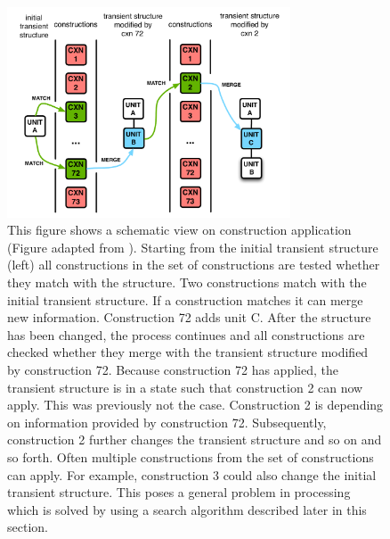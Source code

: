 \begin{figure}
\begin{center}
\includegraphics[width=0.75\textwidth]{figs/high-level-cxn-application}
\end{center}
\caption[Construction application]{This figure shows a schematic view on 
construction application (Figure adapted from \citealp{steels2011design}).
Starting from the initial transient structure (left)
all constructions in the set of constructions are tested whether they 
match with the structure. Two constructions match with the
initial transient structure. If a construction matches it 
can merge new information. Construction 72 adds 
unit C. After the structure has been changed, the process continues
and all constructions are checked whether they merge with
the transient structure modified by construction 72.
Because construction 72 has applied, the transient
structure is in a state such that construction 2 can now apply. 
This was previously not the case. Construction 2 is depending on
information provided by construction 72. Subsequently, construction 2 
further changes the transient structure and so on and so forth.
Often multiple constructions from the set of constructions can apply.
For example, construction 3 could also change the initial transient structure.
This poses a general problem in processing which is solved
by using a search algorithm described later in this section.}
\label{f:cxn-application}
\end{figure}

